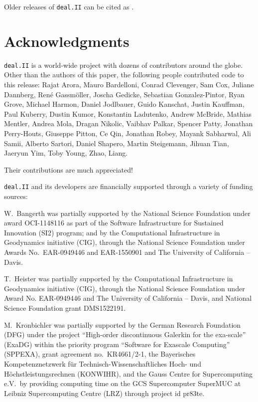\documentclass{ansarticle-preprint}
\newcommand{\specialword}[1]{\texttt{#1}}
\newcommand{\dealii}{{\specialword{deal.II}}}
\begin{document}
Older releases of \dealii{} can be cited as \cite{dealII80,dealII81,dealII82,dealII83,dealII84}.

\nocite{BangerthKanschat1999}

\section{Acknowledgments}

\dealii{} is a world-wide project with dozens of contributors around the
globe. Other than the authors of this paper, the following people contributed code to
this release:
%
%
Rajat  Arora,
Mauro  Bardelloni,
Conrad  Clevenger,
Sam  Cox,
Juliane  Dannberg,
Ren{\'e}  Gassm{\"o}ller,
Joscha  Gedicke,
Sebastian  Gonzalez-Pintor,
Ryan  Grove,
Michael  Harmon,
Daniel  Jodlbauer,
Guido  Kanschat,
Justin  Kauffman,
Paul  Kuberry,
Dustin  Kumor,
Konstantin  Ladutenko,
Andrew  McBride,
Mathias  Mentler,
Andrea  Mola,
Dragan  Nikolic,
Vaibhav  Palkar,
Spencer  Patty,
Jonathan  Perry-Houts,
Giuseppe  Pitton,
Ce  Qin,
Jonathan  Robey,
Mayank  Sabharwal,
Ali  Samii,
Alberto  Sartori,
Daniel  Shapero,
Martin  Steigemann,
Jihuan  Tian,
Jaeryun  Yim,
Toby  Young,
Zhao, Liang.

Their contributions are much appreciated!


\bigskip

\dealii{} and its developers are financially supported through a
variety of funding sources:

W.~Bangerth was partially
supported by the National Science Foundation under award OCI-1148116
as part of the Software Infrastructure for Sustained Innovation (SI2)
program; and by the Computational Infrastructure in Geodynamics initiative
(CIG), through the National Science Foundation under Awards
No.~EAR-0949446 and EAR-1550901 and The University of California -- Davis.

T.~Heister was partially supported by the Computational Infrastructure in
Geodynamics initiative (CIG), through the National Science Foundation
under Award No. EAR-0949446 and The University of California -- Davis, and National Science Foundation grant DMS1522191.

M.~Kronbichler was partially supported by the German Research Foundation (DFG)
under the project ``High-order discontinuous Galerkin for the exa-scale''
(ExaDG) within the priority program ``Software for Exascale Computing''
(SPPEXA), grant agreement no.~KR4661/2-1, the Bayerisches Kompetenznetzwerk
f\"ur Technisch-Wissenschaftliches Hoch- und H\"ochstleistungsrechnen
(KONWIHR), and the Gauss Centre for Supercomputing e.V.~by providing computing
time on the GCS Supercomputer SuperMUC at Leibniz Supercomputing Centre (LRZ)
through project id pr83te.
\end{document}

